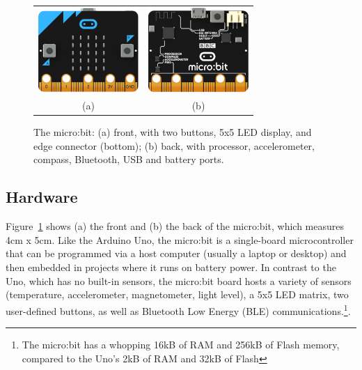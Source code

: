 
\begin{figure} 
  \begin{tabular}{cc}
    \includegraphics[width=1.5in]{images/microbit-front.png} &
    \includegraphics[width=1.5in]{images/microbit-back.png} \\
    (a) & (b) 
  \end{tabular}
  \caption{\label{fig:microbit}The micro:bit: (a) front, with two buttons, 
    5x5 LED display, and edge connector (bottom); (b) back, with processor, accelerometer, compass, Bluetooth, USB and battery ports.}
  \end{figure}
  
\subsection{Hardware}

Figure~\ref{fig:microbit} shows (a) the front and (b) the back of the
micro:bit, which measures 4cm x 5cm. Like the Arduino Uno, 
the micro:bit is a single-board microcontroller 
that can be programmed via a host computer (usually a laptop or desktop)
and then embedded in projects where it runs on battery power.
In contrast to the Uno, which has no built-in sensors, the micro:bit 
board hosts a variety of sensors (temperature, accelerometer, magnetometer, 
light level), 
a 5x5 LED matrix, two user-defined buttons, as well as Bluetooth
Low Energy (BLE) communications.\footnote{The micro:bit has a whopping
16kB of RAM and 256kB of Flash memory, compared to the Uno's 2kB of 
RAM and 32kB of Flash}.

